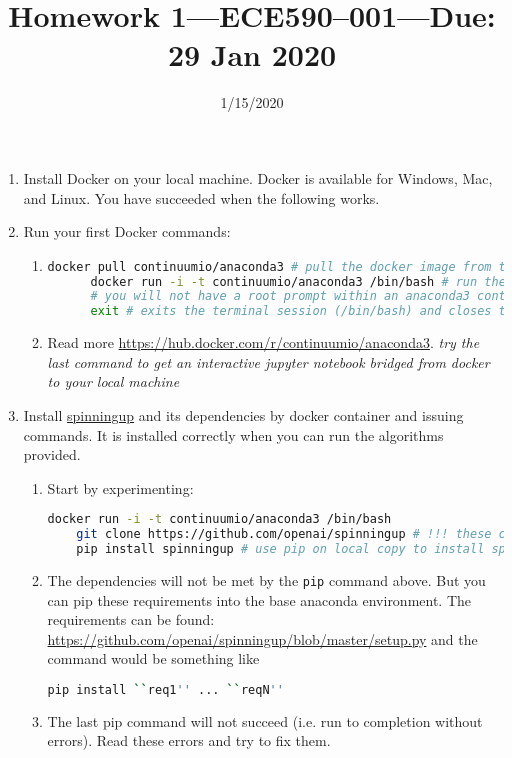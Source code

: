 \documentclass{article}
\title{Homework 1---ECE590--001---{\bf Due: 29 Jan 2020}}
\date{1/15/2020}
\begin{document}
\maketitle
\begin{enumerate}
\item
  Install Docker on your local machine. Docker is available for Windows, Mac,
and Linux. You have succeeded when the following works.
\item
  Run your first Docker commands:
  \begin{enumerate}
  \item 
    \begin{lstlisting}[language=bash]
      docker pull continuumio/anaconda3 # pull the docker image from the container registry
      docker run -i -t continuumio/anaconda3 /bin/bash # run the image interactively
      # you will not have a root prompt within an anaconda3 containers
      exit # exits the terminal session (/bin/bash) and closes terminates the container
    \end{lstlisting}
  \item Read more \url{https://hub.docker.com/r/continuumio/anaconda3}. {\em try the last command
      to get an interactive jupyter notebook bridged from docker to your local machine}
  \end{enumerate}
\item
  Install \href{https://github.com/openai/spinningup}{spinningup} and its
dependencies by docker container and issuing commands. It is installed
correctly when you can run the algorithms provided.
\begin{enumerate}
\item Start by experimenting:
  \begin{lstlisting}[language=bash]
    docker run -i -t continuumio/anaconda3 /bin/bash
    git clone https://github.com/openai/spinningup # !!! these changes are not persistent
    pip install spinningup # use pip on local copy to install spinning up
  \end{lstlisting}
\item The dependencies will not be met by the {\tt pip} command above. But you can pip these
  requirements into the base anaconda environment. The requirements can be found:
  \url{https://github.com/openai/spinningup/blob/master/setup.py} and the command would be something
  like
  \begin{lstlisting}[language=bash]
    pip install ``req1'' ... ``reqN''
  \end{lstlisting}
\item The last pip command will not succeed (i.e. run to completion without errors). Read these errors and try to fix them.

\end{enumerate}
\end{enumerate}
\end{document}
